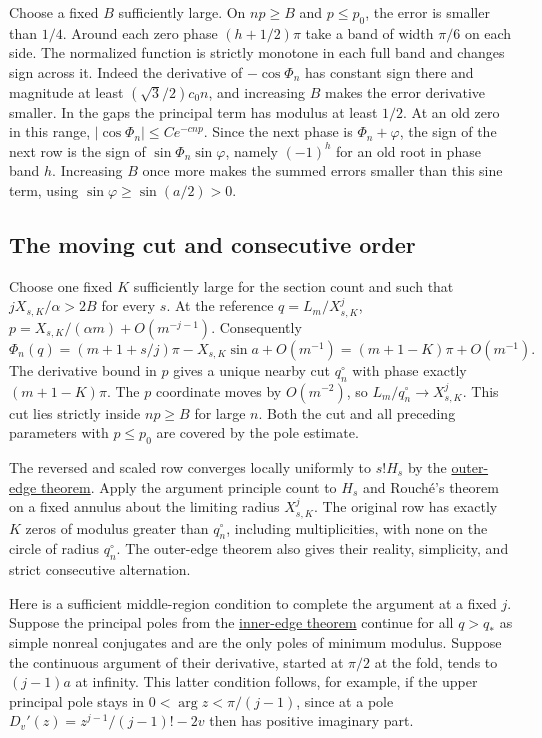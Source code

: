 \documentclass[11pt]{article}
\begin{document}
Choose a fixed $B$ sufficiently large. On $np\ge B$ and $p\le p_0$, the error is smaller than $1/4$. Around each zero phase $(h+1/2)\pi$ take a band of width $\pi/6$ on each side. The normalized function is strictly monotone in each full band and changes sign across it. Indeed the derivative of $-\cos\Phi_n$ has constant sign there and magnitude at least $(\sqrt3/2)c_0 n$, and increasing $B$ makes the error derivative smaller. In the gaps the principal term has modulus at least $1/2$. At an old zero in this range, $|\cos\Phi_n|\le Ce^{-cnp}$. Since the next phase is $\Phi_n+\varphi$, the sign of the next row is the sign of $\sin\Phi_n\sin\varphi$, namely $(-1)^h$ for an old root in phase band $h$. Increasing $B$ once more makes the summed errors smaller than this sine term, using $\sin\varphi\ge\sin(a/2)>0$.

\subsection{The moving cut and consecutive order}

Choose one fixed $K$ sufficiently large for the section count and such that $jX_{s,K}/\alpha>2B$ for every $s$. At the reference $q=L_m/X_{s,K}^j$, $p=X_{s,K}/(\alpha m)+O(m^{-j-1})$. Consequently
\[
\Phi_n(q)=(m+1+s/j)\pi-X_{s,K}\sin a+O(m^{-1})=(m+1-K)\pi+O(m^{-1}).
\]
The derivative bound in $p$ gives a unique nearby cut $q_n^\circ$ with phase exactly $(m+1-K)\pi$. The $p$ coordinate moves by $O(m^{-2})$, so $L_m/q_n^\circ\to X_{s,K}^j$. This cut lies strictly inside $np\ge B$ for large $n$. Both the cut and all preceding parameters with $p\le p_0$ are covered by the pole estimate.

The reversed and scaled row converges locally uniformly to $s!H_s$ by the \href{https://github.com/ProgramComputer/open-math-research/blob/main/topics/ordered-large-blocks/fixed-threshold-outer-zeros.md}{outer-edge theorem}. Apply the argument principle count to $H_s$ and Rouch\'{e}'s theorem on a fixed annulus about the limiting radius $X_{s,K}^j$. The original row has exactly $K$ zeros of modulus greater than $q_n^\circ$, including multiplicities, with none on the circle of radius $q_n^\circ$. The outer-edge theorem also gives their reality, simplicity, and strict consecutive alternation.

Here is a sufficient middle-region condition to complete the argument at a fixed $j$. Suppose the principal poles from the \href{https://github.com/ProgramComputer/open-math-research/blob/main/topics/ordered-large-blocks/fixed-threshold-inner-zeros.md}{inner-edge theorem} continue for all $q>q_*$ as simple nonreal conjugates and are the only poles of minimum modulus. Suppose the continuous argument of their derivative, started at $\pi/2$ at the fold, tends to $(j-1)a$ at infinity. This latter condition follows, for example, if the upper principal pole stays in $0<\arg z<\pi/(j-1)$, since at a pole $D_v'(z)=z^{j-1}/(j-1)!-2v$ then has positive imaginary part.
\end{document}
